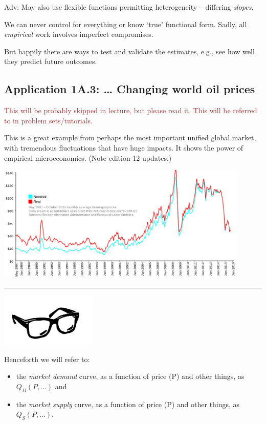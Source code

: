 \documentclass[]{article}
\providecommand{\tightlist}{%
  \setlength{\itemsep}{0pt}\setlength{\parskip}{0pt}}
\begin{document}
\textcolor{RawSienna}{Adv: May also use flexible functions permitting heterogeneity -- differing \emph{slopes}.}

We can never control for everything or know `true' functional form.
Sadly, all \emph{empirical} work involves imperfect compromises.

But happily there are ways to test and validate the estimates, e.g., see
how well they predict future outcomes.

\hypertarget{application-1a.3-changing-world-oil-prices}{%
\subsection{Application 1A.3: \ldots{} Changing world oil
prices}\label{application-1a.3-changing-world-oil-prices}}

\textcolor{brown}{This will be probably skipped in lecture, but please read it. This will be referred to in problem sets/tutorials.}

This is a great example from perhaps the most important unified global
market, with tremendous fluctuations that have huge impacts. It shows
the power of empirical microeconomics. (Note edition 12 updates.)

\includegraphics[height=2.2in]{picsfigs/Brent_Spot_monthly.png}

\begin{center}\rule{0.5\linewidth}{\linethickness}\end{center}

\includegraphics[height=1in]{picsfigs/glasses.png}

Henceforth we will refer to:

\begin{itemize}
\tightlist
\item
  the \emph{market demand} curve, as a function of price (P) and other
  things, as \(Q_D(P,...)\) and
\item
  the \emph{market supply} curve, as a function of price (P) and other
  things, as \(Q_S(P,...)\).
\end{itemize}
\end{document}
